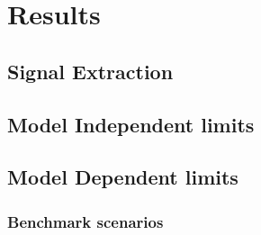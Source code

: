 \section{Results}

\subsection{Signal Extraction}

\subsection{Model Independent limits}

\subsection{Model Dependent limits}

\subsubsection{Benchmark scenarios}




